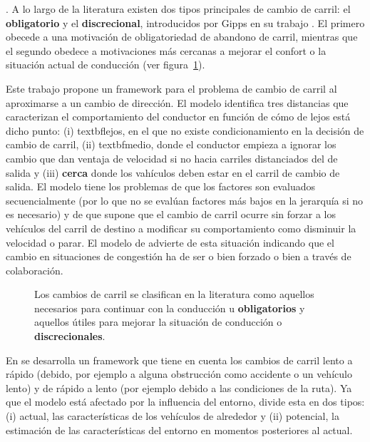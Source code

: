 . A lo largo de la literatura existen dos tipos principales de cambio de carril: el \textbf{obligatorio} y el \textbf{discrecional}, introducidos por Gipps en su trabajo \cite{Gipps1986}. El primero obecede a una motivación de obligatoriedad de abandono de carril, mientras que el segundo obedece a motivaciones más cercanas a mejorar el confort o la situación actual de conducción (ver figura~\ref{fig:lane-change-mandatory-vs-discretional}).

Este trabajo propone un framework para el problema de cambio de carril al aproximarse a un cambio de dirección. El modelo identifica tres distancias que caracterizan el comportamiento del conductor en función de cómo de lejos está dicho punto: (i) textbf{lejos}, en el que no existe condicionamiento en la decisión de cambio de carril, (ii) textbf{medio}, donde el conductor empieza a ignorar los cambio que dan ventaja de velocidad si no hacia carriles distanciados del de salida y (iii) \textbf{cerca} donde los vahículos deben estar en el carril de cambio de salida. El modelo tiene los problemas de que los factores son evaluados secuencialmente (por lo que no se evalúan factores más bajos en la jerarquía si no es necesario) y de que supone que el cambio de carril ocurre sin forzar a los vehículos del carril de destino a modificar su comportamiento como disminuir la velocidad o parar. El modelo de \cite{Hidas2002} advierte de esta situación indicando que el cambio en situaciones de congestión ha de ser o bien forzado o bien a través de colaboración.

\begin{figure}
	\caption{Los cambios de carril se clasifican en la literatura como aquellos necesarios para continuar con la conducción u \textbf{obligatorios} y aquellos útiles para mejorar la situación de conducción o \textbf{discrecionales}.}
	\label{fig:lane-change-mandatory-vs-discretional}
\end{figure}

En \cite{wiedemann1992microscopic} se desarrolla un framework que tiene en cuenta los cambios de carril lento a rápido (debido, por ejemplo a alguna obstrucción como accidente o un vehículo lento) y de rápido a lento (por ejemplo debido a las condiciones de la ruta). Ya que el modelo está afectado por la influencia del entorno, divide esta en dos tipos: (i) actual, las características de los vehículos de alrededor y (ii) potencial, la estimación de las características del entorno en momentos posteriores al actual.

